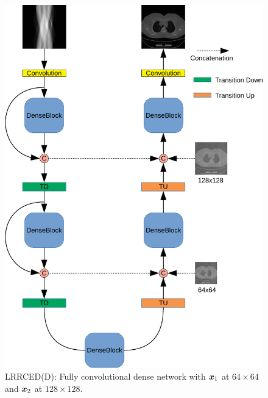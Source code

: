 \begin{figure}[!t]
	\centering
	\includegraphics[width=.83\linewidth]{./Figures/densenet-crop.pdf}
	\caption{\ac{LRRCED}(D): Fully convolutional dense network with $\bm{x}_1$ at $64\times64$ and $\bm{x}_2$ at $128\times128$.}
	\label{fig:dn}
\end{figure}



